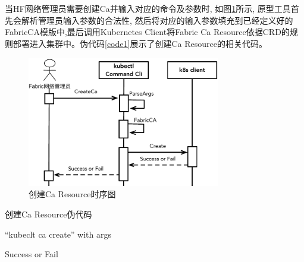 当HF网络管理员需要创建Ca并输入对应的命令及参数时, 如图\ref{create_crd}所示, 原型工具首先会解析管理员输入参数的合法性, 然后将对应的输入参数填充到已经定义好的FabricCA模版中,最后调用Kubernetes Client将Fabric Ca Resource依据CRD的规则部署进入集群中。伪代码\ref{code1}展示了创建Ca Resource的相关代码。

\begin{figure}[!htbp] %
    \centering %
    \includegraphics[width=0.75\textwidth]{FIGs/chapter4/create_crd.pdf} %
    \caption{创建Ca Resource时序图} %
    \label{create_crd} %
\end{figure}%


\begin{algorithm}[!htbp]
    \caption{\footnotesize 创建Ca Resource伪代码}
    \label{code1}
    {\footnotesize
    \begin{algorithmic}
        \renewcommand{\algorithmicrequire}{ \textbf{Input:}}
        \REQUIRE  
        “kubeclt ca create” with args

        \renewcommand{\algorithmicensure}{\textbf{Output:}}
        \ENSURE
        Success or Fail




        \ELSE
        \ENDIF

    \end{algorithmic}
    }
\end{algorithm}

